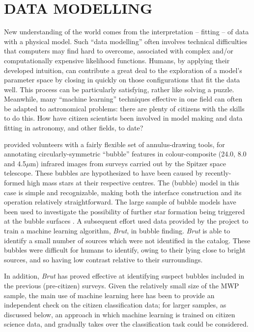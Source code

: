 \documentclass{ar2e}
\def\CaseStudy#1{\noindent{\it\bf #1 \,\,\,\,}}
\begin{document}

\section{DATA MODELLING}
\label{sec:model}

New understanding of the world comes from the interpretation -- fitting -- of
data with a physical model. Such ``data modelling'' often involves technical
difficulties that computers may find hard to overcome, associated with complex
and/or computationally expensive likelihood functions. Humans, by applying their
developed intuition, can contribute a great deal to the exploration of a model's
parameter space by closing in quickly on those configurations that fit the data
well. This process can be particularly satisfying, rather like solving a puzzle.
Meanwhile, many ``machine learning'' techniques effective in one field can often
be adapted to astronomical problems: there are plenty of citizens with the
skills to do this. How have citizen scientists been involved in model making and
data fitting in astronomy, and other fields, to date?


\CaseStudy{The Milky Way Project}
\citet{Simpson++2012MWP} provided volunteers with a fairly flexible set of
annulus-drawing tools, for annotating circularly-symmetric ``bubble'' features
in colour-composite (24.0, 8.0 and  4.5$\mu$m) infrared images from surveys
carried out by the Spitzer space telescope. These bubbles are hypothesized to
have been caused by recently-formed high mass stars at their respective centres. The
(bubble) model in this case is simple and recognizable, making both the
interface construction and its operation relatively straightforward. The large
sample of  bubble models have been used to investigate the possibility of
further star formation being triggered at the bubble surfaces
\citep{KendrewEtal2012}. A subsequent effort \citep{Beaumont} used data provided
by the project to train a machine learning algorithm, \emph{Brut}, in bubble
finding. \emph{Brut} is able to identify a small number of sources  which were
not identified in the \citeauthor{Simpson++2012MWP} catalog. These bubbles were
difficult for humans to identify,  owing to their lying close to bright sources,
and so having low contrast relative to their surroundings.

In addition, \emph{Brut} has proved effective at identifying suspect bubbles
included in the previous (pre-citizen) surveys. Given the relatively small size
of the MWP sample, the main use of machine learning here has been to provide an
independent check on the citizen classification data; for larger samples, as
discussed below, an approach in which machine learning is trained on citizen
science data, and gradually takes over the classification task could be
considered. 
\end{document}

